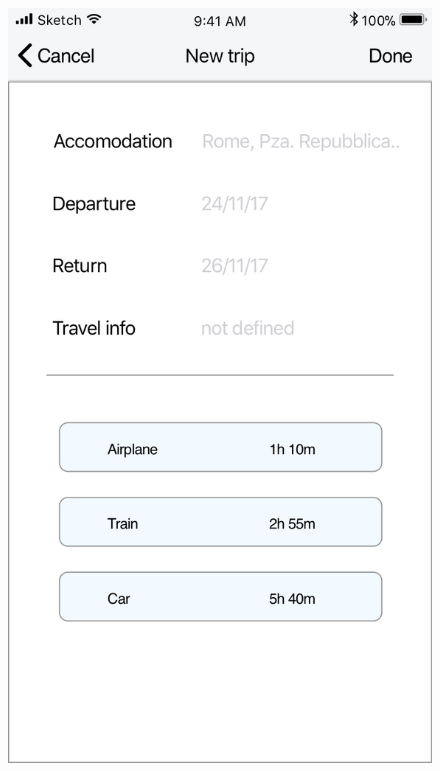 \begin{enumerate}
\begin{figure}[H]
				\includegraphics[scale=0.25]{Images/Sketch/Trip_1}
				\hspace{0.5cm}

\end{figure}
\end{enumerate}
